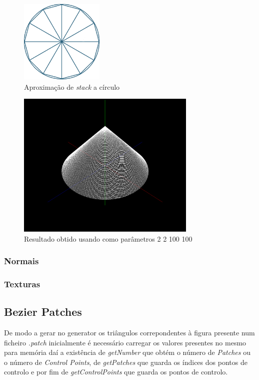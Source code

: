 \documentclass{article}
\begin{document}
\begin{figure}[H]
    \centering
    \includegraphics[height=4cm]{circleStack.png}
    \caption{Aproximação de \textit{stack} a círculo}
\end{figure}


\begin{figure}[H]
    \centering
    \includegraphics[height=7cm]{coneFinal.png}
    \caption{Resultado obtido usando como parâmetros 2 2 100 100} 
\end{figure}

\newpage

\subsubsection{Normais}

\subsubsection{Texturas}

\subsection{Bezier Patches}
De modo a gerar no generator os triângulos correpondentes à figura presente num ficheiro \textit{.patch} inicialmente é necessário carregar os valores presentes no mesmo para memória daí a existência de \textit{getNumber} que obtém o número de \textit{Patches} ou o número de \textit{Control Points}, de \textit{getPatches} que guarda os índices dos pontos de controlo e por fim de \textit{getControlPoints} que guarda os pontos de controlo.
\end{document}
